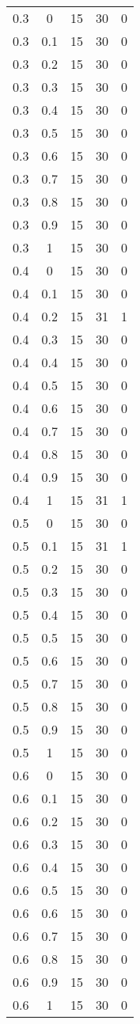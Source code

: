 \begin{longtable}{|c|c|c|c|c|}
	0.3& 0& 15& 30& 0 \\
	0.3& 0.1& 15& 30& 0 \\
	0.3& 0.2& 15& 30& 0 \\
	0.3& 0.3& 15& 30& 0 \\
	0.3& 0.4& 15& 30& 0 \\
	0.3& 0.5& 15& 30& 0 \\
	0.3& 0.6& 15& 30& 0 \\
	0.3& 0.7& 15& 30& 0 \\
	0.3& 0.8& 15& 30& 0 \\
	0.3& 0.9& 15& 30& 0 \\
	0.3& 1& 15& 30& 0 \\
	\hline
	
	0.4& 0& 15& 30& 0 \\
	0.4& 0.1& 15& 30& 0 \\
	0.4& 0.2& 15& 31& 1 \\
	0.4& 0.3& 15& 30& 0 \\
	0.4& 0.4& 15& 30& 0 \\
	0.4& 0.5& 15& 30& 0 \\
	0.4& 0.6& 15& 30& 0 \\
	0.4& 0.7& 15& 30& 0 \\
	0.4& 0.8& 15& 30& 0 \\
	0.4& 0.9& 15& 30& 0 \\
	0.4& 1& 15& 31& 1 \\
	\hline
	
	0.5& 0& 15& 30& 0 \\
	0.5& 0.1& 15& 31& 1 \\
	0.5& 0.2& 15& 30& 0 \\
	0.5& 0.3& 15& 30& 0 \\
	0.5& 0.4& 15& 30& 0 \\
	0.5& 0.5& 15& 30& 0 \\
	0.5& 0.6& 15& 30& 0 \\
	0.5& 0.7& 15& 30& 0 \\
	0.5& 0.8& 15& 30& 0 \\
	0.5& 0.9& 15& 30& 0 \\
	0.5& 1& 15& 30& 0 \\
	\hline
	
	0.6& 0& 15& 30& 0 \\
	0.6& 0.1& 15& 30& 0 \\
	0.6& 0.2& 15& 30& 0 \\
	0.6& 0.3& 15& 30& 0 \\
	0.6& 0.4& 15& 30& 0 \\
	0.6& 0.5& 15& 30& 0 \\
	0.6& 0.6& 15& 30& 0 \\
	0.6& 0.7& 15& 30& 0 \\
	0.6& 0.8& 15& 30& 0 \\
	0.6& 0.9& 15& 30& 0 \\
	0.6& 1& 15& 30& 0 \\
	\hline
	

\end{longtable}

